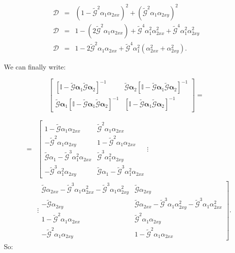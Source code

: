 \begin{eqnarray}
\mathcal{D} & = & \left(1-\tilde{\mathcal{G}}^{2}\alpha_{1}\alpha_{2xx}\right)^{2}+\left(\tilde{\mathcal{G}}^{2}\alpha_{1}\alpha_{2xy}\right)^{2}\\
\mathcal{D} & = & 1-\left(2\tilde{\mathcal{G}}^{2}\alpha_{1}\alpha_{2xx}\right)+\tilde{\mathcal{G}}^{4}\alpha_{1}^{2}\alpha_{2xx}^{2}+\tilde{\mathcal{G}}^{4}\alpha_{1}^{2}\alpha_{2xy}^{2}\\
\mathcal{D} & = & 1-2\tilde{\mathcal{G}}^{2}\alpha_{1}\alpha_{2xx}+\tilde{\mathcal{G}}^{4}\alpha_{1}^{2}\left(\alpha_{2xx}^{2}+\alpha_{2xy}^{2}\right).
\end{eqnarray}

We can finally write:

\begin{equation}
\begin{bmatrix}\left[\mathbb{I}-\tilde{\mathcal{G}}\boldsymbol{\alpha}_{1}\tilde{\mathcal{G}}\boldsymbol{\alpha}_{2}\right]^{-1} & \tilde{\mathcal{G}}\boldsymbol{\alpha}_{2}\left[\mathbb{I}-\tilde{\mathcal{G}}\boldsymbol{\alpha}_{1}\tilde{\mathcal{G}}\boldsymbol{\alpha}_{2}\right]^{-1}\\
\tilde{\mathcal{G}}\boldsymbol{\alpha}_{1}\left[\mathbb{I}-\tilde{\mathcal{G}}\boldsymbol{\alpha}_{1}\tilde{\mathcal{G}}\boldsymbol{\alpha}_{2}\right]^{-1} & \left[\mathbb{I}-\tilde{\mathcal{G}}\boldsymbol{\alpha}_{1}\tilde{\mathcal{G}}\boldsymbol{\alpha}_{2}\right]^{-1}
\end{bmatrix}=
\end{equation}

\begin{eqnarray}
& = & \left[\begin{array}{cc}
1-\tilde{\mathcal{G}}\alpha_{1}\alpha_{2xx} & \tilde{\mathcal{G}}^{2}\alpha_{1}\alpha_{2xx}\\
-\tilde{\mathcal{G}}^{2}\alpha_{1}\alpha_{2xy} & 1-\tilde{\mathcal{G}}^{2}\alpha_{1}\alpha_{2xx}\\
\tilde{\mathcal{G}}\alpha_{1}-\tilde{\mathcal{G}}^{3}\alpha_{1}^{2}\alpha_{2xx} & \tilde{\mathcal{G}}^{3}\alpha_{1}^{2}\alpha_{2xy}\\
-\tilde{\mathcal{G}}^{3}\alpha_{1}^{2}\alpha_{2xy} & \tilde{\mathcal{G}}\alpha_{1}-\tilde{\mathcal{G}}^{3}\alpha_{1}^{2}\alpha_{2xx}
\end{array}\right. \vdots \nonumber\\
& &
\vdots\left.\begin{array}{cc}
\tilde{\mathcal{G}}\alpha_{2xx}-\tilde{\mathcal{G}}^{3}\alpha_{1}\alpha_{2xx}^{2}-\tilde{\mathcal{G}}^{3}\alpha_{1}\alpha_{2xy}^{2} & \tilde{\mathcal{G}}\alpha_{2xy}\\
-\tilde{\mathcal{G}}\alpha_{2xy} & \tilde{\mathcal{G}}\alpha_{2xx}-\tilde{\mathcal{G}}^{3}\alpha_{1}\alpha_{2xy}^{2}-\tilde{\mathcal{G}}^{3}\alpha_{1}\alpha_{2xx}^{2}\\
1-\tilde{\mathcal{G}}^{2}\alpha_{1}\alpha_{2xx} & \tilde{\mathcal{G}}^{2}\alpha_{1}\alpha_{2xy}\\
-\tilde{\mathcal{G}}^{2}\alpha_{1}\alpha_{2xy} & 1-\tilde{\mathcal{G}}^{2}\alpha_{1}\alpha_{2xx}
\end{array}\right]. \nonumber
\end{eqnarray}
So:

